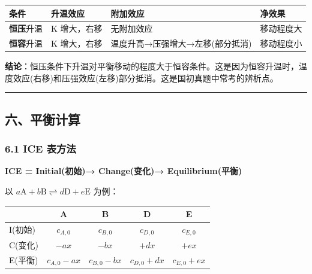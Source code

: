 \documentclass[a4paper,11pt]{ctexart}
\newcounter{none}
\begin{document}
{\def\LTcaptype{none} %
\begin{longtable}[]{@{}
  >{\raggedright\arraybackslash}p{}
  >{\raggedright\arraybackslash}p{}
  >{\raggedright\arraybackslash}p{}
  >{\raggedright\arraybackslash}p{}@{}}
\toprule\noalign{}
\begin{minipage}[b]{\linewidth}\raggedright
条件
\end{minipage} & \begin{minipage}[b]{\linewidth}\raggedright
升温效应
\end{minipage} & \begin{minipage}[b]{\linewidth}\raggedright
附加效应
\end{minipage} & \begin{minipage}[b]{\linewidth}\raggedright
净效果
\end{minipage} \\
\midrule\noalign{}
\endhead
\bottomrule\noalign{}
\endlastfoot
\textbf{恒压}升温 & K 增大，右移 & 无附加效应 & 移动程度大 \\
\textbf{恒容}升温 & K 增大，右移 & 温度升高→压强增大→左移(部分抵消) & 移动程度小 \\
\end{longtable}
}

\textbf{结论}：恒压条件下升温对平衡移动的程度大于恒容条件。这是因为恒容升温时，温度效应(右移)和压强效应(左移)部分抵消。这是国初真题中常考的辨析点。

\begin{center}\rule{0.5\linewidth}{0.5pt}\end{center}

\subsection{六、平衡计算}\label{ux516dux5e73ux8861ux8ba1ux7b97}

\subsubsection{6.1 ICE 表方法}\label{ice-ux8868ux65b9ux6cd5}

\textbf{ICE = Initial(初始)→ Change(变化)→ Equilibrium(平衡)}

以 \(a\mathrm{A} + b\mathrm{B} \rightleftharpoons d\mathrm{D} + e\mathrm{E}\) 为例：

{\def\LTcaptype{none} %
\begin{longtable}[]{@{}lcccc@{}}
\toprule\noalign{}
& A & B & D & E \\
\midrule\noalign{}
\endhead
\bottomrule\noalign{}
\endlastfoot
I(初始) & \(c_{A,0}\) & \(c_{B,0}\) & \(c_{D,0}\) & \(c_{E,0}\) \\
C(变化) & \(-ax\) & \(-bx\) & \(+dx\) & \(+ex\) \\
E(平衡) & \(c_{A,0}-ax\) & \(c_{B,0}-bx\) & \(c_{D,0}+dx\) & \(c_{E,0}+ex\) \\
\end{longtable}
}
\end{document}
